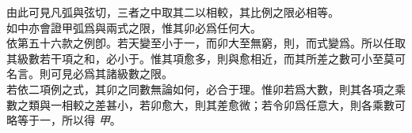 \begin{enumerate} [label={第\chinese*款}]
	由此可見凡弧與弦切，三者之中取其二以相較，其比例之限必相等。\\
	如中亦會證甲弧爲\CJKmove 與\CJKmove 兩式之限，惟其卯必爲任何大。\\
	依第五十六款之例\CJKmove 卽\CJKmove。若天變至小于一，而卯大至無窮，則\CJKmove ，而式變爲\CJKmove。所以任取其級數若干項之和，必小于\CJKmove。惟其項愈多，則與\CJKmove 愈相近，而其所差之數可小至莫可名言。則可見\CJKmove 必爲其諸級數之限。\\
	若依二項例之式\CJKmove ，其卯之同數無論如何，必合于理。惟卯若爲大數，則其各項之乘數\CJKmove 之類與一相較之差甚小，若卯愈大，則其差愈微；若令卯爲任意大，則各乘數可略等于一，所以得\CJKmove \raisebox{1pt} {\textcircled{\raisebox{-.5pt} {\small\textit{甲}}}}。\\

\end{enumerate}
